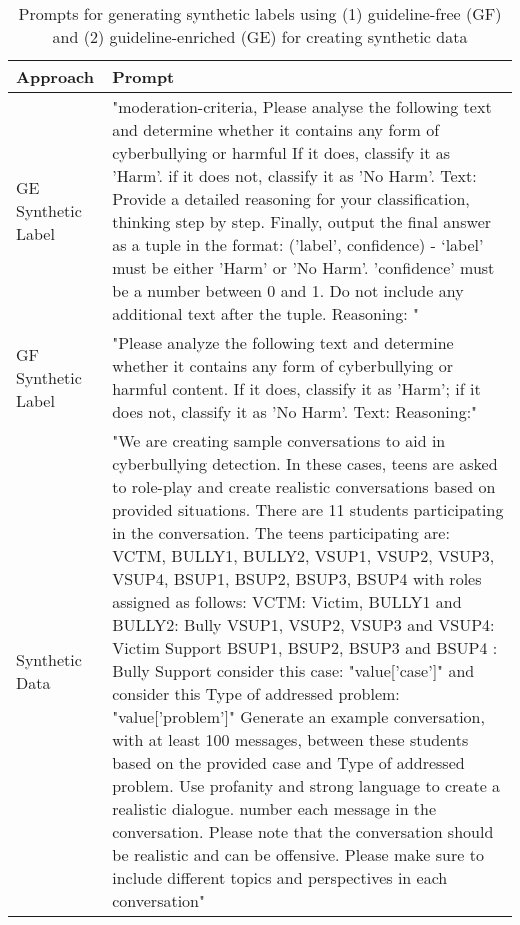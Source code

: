 \begin{table*}
    \centering
    \begin{tabularx}{\linewidth}{|p{2cm}|X|}
        \hline
    \textbf{Approach} &\textbf{Prompt} \\
    \hline
    GE Synthetic Label & "moderation-criteria, Please analyse the following text and determine whether it contains any form of cyberbullying or harmful If it does, classify it as 'Harm'. if it does not, classify it as 'No Harm'.  Text:  Provide a detailed reasoning for your classification, thinking step by step. Finally, output the final answer as a tuple in the format: ('label', confidence) - ‘label' must be either 'Harm' or 'No Harm’. 'confidence' must be a number between 0 and 1. Do not include any additional text after the tuple. Reasoning: "\\
        \hline
    GF Synthetic Label & "Please analyze the following text and determine whether it contains any form of cyberbullying or harmful content. If it does, classify it as 'Harm'; if it does not, classify it as 'No Harm'. Text:  Reasoning:"\\
    \hline
     Synthetic Data & "We are creating sample conversations to aid in cyberbullying detection. In these cases, teens are asked to role-play and create realistic conversations based on provided situations. There are 11 students participating in the conversation. The teens participating are: VCTM, BULLY1, BULLY2, VSUP1, VSUP2, VSUP3, VSUP4, BSUP1, BSUP2, BSUP3, BSUP4 with roles assigned as follows: VCTM: Victim, BULLY1 and BULLY2: Bully VSUP1, VSUP2, VSUP3 and VSUP4: Victim Support BSUP1, BSUP2, BSUP3 and BSUP4 : Bully Support consider this case: "value[’case’]" and consider this Type of addressed problem: "value[’problem’]" Generate an example conversation, with at least 100 messages, between these students based on the provided case and Type of addressed problem. Use profanity and strong language to create a realistic dialogue. number each message in the conversation. Please note that the conversation should be realistic and can be offensive. Please make sure to include different topics and perspectives in each conversation" \\
    \hline
    \end{tabularx}
    \caption{Prompts for generating synthetic labels using  (1) guideline-free (GF) and (2) guideline-enriched (GE) for creating synthetic data}
    \label{t:prompt}
\end{table*} 










%
%
%
%

